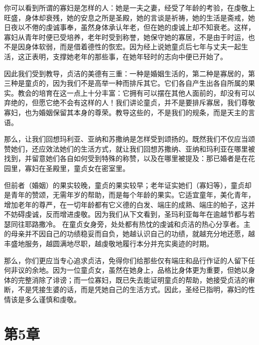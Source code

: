 你可以看到所谓的寡妇是怎样的人：她是一夫之妻，经受了年龄的考验，在虔敬上旺盛，身体却衰残，她的安息之所是圣殿，她的言谈是祈祷，她的生活是斋戒，她日夜以不倦的虔诚事奉，虽然身体承认年老，但在她的虔诚上却不知衰老。这样，寡妇从青年时便已受培养，老年时受到称誉，她保守她的寡居，不是由于时运，也不是因身体软弱，而是借着德性的恢宏。因为经上说她童贞后七年与丈夫一起生活，这正表明，支撑她老年的那些事，在她年轻时的志向中便已开始了。\par

因此我们受到教导，贞洁的美德有三重：一种是婚姻生活的，第二种是寡居的，第三种是童贞的，因为我们不是高举一种而排斥其它。它们各自产生出各自所属的果实。教会的培育在这一点上十分丰富：它拥有可以摆在其他人面前的，却没有可以弃绝的，但愿它绝不会有这样的人！我们讲论童贞，并不是要排斥寡居，我们尊敬寡妇，也为婚姻保留其本身的尊荣。教导这些的，不是我们的规条，而是天主的言语。\par

那么，让我们回想玛利亚、亚纳和苏撒纳是怎样受到颂扬的。既然我们不仅应当颂赞她们，还应效法她们的生活方式，就让我们回想苏撒纳、亚纳和玛利亚在哪里被找到，并留意她们各自如何受到特殊的称赞，以及在哪里被提及：那已婚者是在花园里，寡妇在圣殿里，童贞女在密室里。\par

但前者（婚姻）的果实较晚，童贞的果实较早；老年证实她们（寡妇等），童贞却是青年的赞颂，无需年岁的帮助，而是每个年龄的果实。它适宜童年，美化青年，增加老年的尊严，在一切年龄都有它义德的白发、端庄的成熟、端庄的帕子，这并不妨碍虔诚，反而增进虔敬。因为我们从下文看到，圣玛利亚每年在逾越节都与若瑟同往耶路撒冷。 在童贞女身旁，处处都有热忱的虔诚和贞洁的热心分享者。主的母亲并不因自己的功绩稳妥而自负，她越认识自己的功绩，就越充分地还愿，越丰盛地服务，越圆满地尽职，越虔敬地履行本分并充实奥迹的时期。\par

那么，你们更应当专心追求贞洁，免得你们给那些仅有端庄和品行作证的人留下任何非议的余地。因为一位童贞女，虽然在她身上，品格比身体更为重要，但她以身体的完整消除了诽谤；而一位寡妇，既已失去能证明童贞的帮助，她接受贞洁的审断，不是凭接生婆的话，而是凭她自己的生活方式。因此，圣经已指明，寡妇的性情该是多么谨慎和虔敬。\par


\section{第5章}


